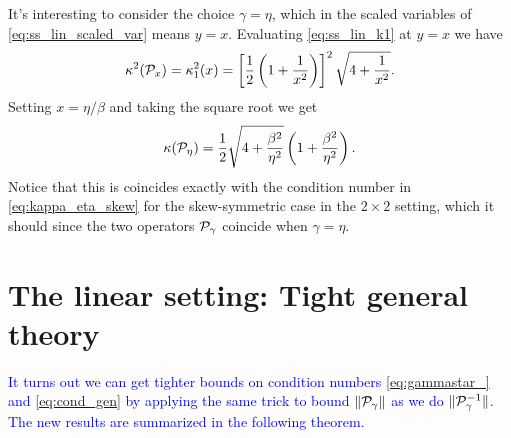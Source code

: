 \documentclass[a4paper,10pt]{article}
\newcommand{\tcb}{\textcolor{blue}}
\begin{document}
It's interesting to consider the choice $\gamma = \eta$, which in the scaled variables of \eqref{eq:ss_lin_scaled_var} means $y = x$. Evaluating \eqref{eq:ss_lin_k1} at $y = x$ we have
\begin{align*}
\kappa^2({\cal P}_{x}) = \kappa_1^2(x) = \left[ \frac{1}{2} \left( 1 + \frac{1}{x^2} \right) \right]^2 \sqrt{4 + \frac{1}{x^2}}.
\end{align*}
Setting $x = \eta/\beta$ and taking the square root we get
\begin{align*}
\kappa({\cal P}_{\eta}) = \frac{1}{2} \sqrt{4 + \frac{\beta^2}{\eta^2}} \left(1 + \frac{\beta^2}{\eta^2} \right) .
\end{align*}
Notice that this is coincides exactly with the condition number in \eqref{eq:kappa_eta_skew} for the skew-symmetric case in the $2 \times 2$ setting, which it should since the two operators ${\cal P}_{\gamma}$ coincide when $\gamma = \eta$.

\section{The linear setting: Tight general theory}
\tcb{
It turns out we can get tighter bounds on condition numbers \eqref{eq:gammastar_} and \eqref{eq:cond_gen} by applying the same trick to bound $\Vert {\cal P}_{\gamma} \Vert$ as we do $\Vert {\cal P}_{\gamma}^{-1} \Vert$. The new results are summarized in the following theorem.
}
\end{document}
